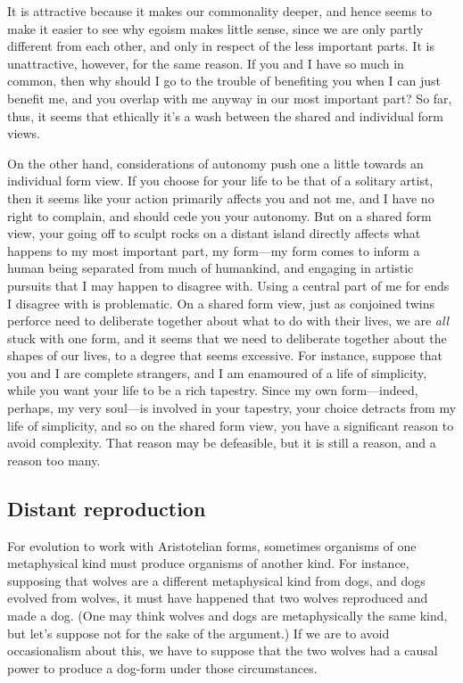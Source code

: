 It is attractive because it makes our commonality deeper, and hence seems to make it easier to see
why egoism makes little sense, since we are only partly different from each other, and only in
respect of the less important parts. It is unattractive, however, for the same reason. If 
you and I have so much in common, then why should I go to the trouble of benefiting you when 
I can just benefit me, and you overlap with me anyway in our most important part? So far, thus,
it seems that ethically it's a wash between the shared and individual form views.

On the other hand, considerations of autonomy push one a little towards an individual form view.
If you choose for your life to be that of a solitary artist, then it seems like your action 
primarily affects you and not me, and I have no right to complain, and should cede you your
autonomy. But on a shared form view, your going off to sculpt rocks on a distant island directly affects
what happens to my most important part, my form---my form comes to inform a human being separated
from much of humankind, and engaging in artistic pursuits that I may happen to disagree with. Using 
a central part of me for ends I disagree with is problematic. On a shared form view, just as conjoined
twins perforce need to deliberate together about what to do with their lives, we are \textit{all} stuck with
one form, and it seems that we need to deliberate together about the shapes of our lives, to a degree
that seems excessive. For instance, suppose that you and I are complete strangers, and I am enamoured of 
a life of simplicity, while you want
your life to be a rich tapestry. Since my own form---indeed, perhaps, my very soul---is involved in your
tapestry, your choice detracts from my life of simplicity, and so on the shared form view, you have a significant 
reason to avoid complexity. That reason may be defeasible, but it is still a reason, and a reason too many. 

\subsection{Distant reproduction}
For evolution to
work with Aristotelian forms, sometimes organisms of one metaphysical
kind must produce organisms of another kind. For instance, supposing
that wolves are a different metaphysical kind from dogs, and dogs
evolved from wolves, it must have happened that two wolves reproduced
and made a dog. (One may think wolves and dogs are metaphysically the same
kind, but let's suppose not for the sake of the argument.) If we
are to avoid occasionalism about this, we have to suppose that the two
wolves had a causal power to produce a dog-form under those
circumstances.

